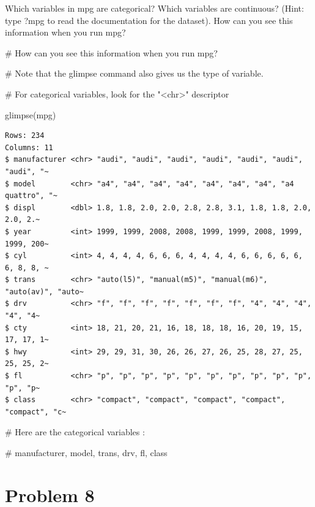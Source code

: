 \documentclass[
  letterpaper,
  DIV=11,
  numbers=noendperiod]{scrreprt}
\newenvironment{Shaded}{\begin{snugshade}}{\end{snugshade}}
\newcommand{\CommentTok}[1]{\textcolor[rgb]{0.37,0.37,0.37}{#1}}
\newcommand{\FunctionTok}[1]{\textcolor[rgb]{0.28,0.35,0.67}{#1}}
\newcommand{\NormalTok}[1]{\textcolor[rgb]{0.00,0.23,0.31}{#1}}
\begin{document}

Which variables in mpg are categorical? Which variables are continuous?
(Hint: type ?mpg to read the documentation for the dataset). How can you
see this information when you run mpg?

\begin{Shaded}
\begin{Highlighting}[]
\CommentTok{\# How can you see this information when you run mpg?}

\CommentTok{\# Note that the glimpse command also gives us the type of variable.}

\CommentTok{\# For categorical variables, look for the "\textless{}chr\textgreater{}" descriptor}

\FunctionTok{glimpse}\NormalTok{(mpg)}
\end{Highlighting}
\end{Shaded}

\begin{verbatim}
Rows: 234
Columns: 11
$ manufacturer <chr> "audi", "audi", "audi", "audi", "audi", "audi", "audi", "~
$ model        <chr> "a4", "a4", "a4", "a4", "a4", "a4", "a4", "a4 quattro", "~
$ displ        <dbl> 1.8, 1.8, 2.0, 2.0, 2.8, 2.8, 3.1, 1.8, 1.8, 2.0, 2.0, 2.~
$ year         <int> 1999, 1999, 2008, 2008, 1999, 1999, 2008, 1999, 1999, 200~
$ cyl          <int> 4, 4, 4, 4, 6, 6, 6, 4, 4, 4, 4, 6, 6, 6, 6, 6, 6, 8, 8, ~
$ trans        <chr> "auto(l5)", "manual(m5)", "manual(m6)", "auto(av)", "auto~
$ drv          <chr> "f", "f", "f", "f", "f", "f", "f", "4", "4", "4", "4", "4~
$ cty          <int> 18, 21, 20, 21, 16, 18, 18, 18, 16, 20, 19, 15, 17, 17, 1~
$ hwy          <int> 29, 29, 31, 30, 26, 26, 27, 26, 25, 28, 27, 25, 25, 25, 2~
$ fl           <chr> "p", "p", "p", "p", "p", "p", "p", "p", "p", "p", "p", "p~
$ class        <chr> "compact", "compact", "compact", "compact", "compact", "c~
\end{verbatim}

\begin{Shaded}
\begin{Highlighting}[]
\CommentTok{\# Here are the categorical variables :}

\CommentTok{\# manufacturer, model, trans, drv, fl, class}
\end{Highlighting}
\end{Shaded}

\section*{Problem 8}\label{problem-8-3}
\end{document}
